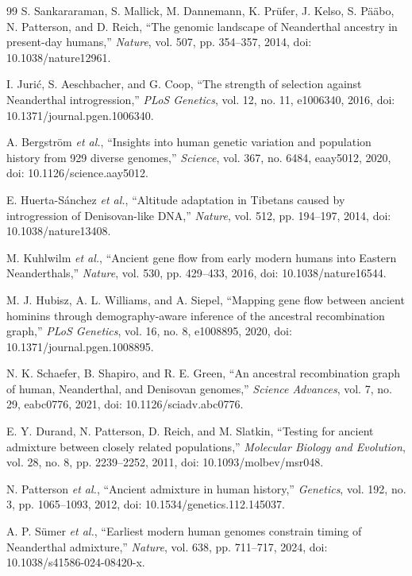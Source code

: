 \documentclass[conference]{IEEEtran}
\begin{document}
\begin{thebibliography}{99}
S. Sankararaman, S. Mallick, M. Dannemann, K. Pr\"ufer, J. Kelso, S. P\"a\"abo, N. Patterson, and D. Reich, ``The genomic landscape of Neanderthal ancestry in present-day humans,'' \emph{Nature}, vol. 507, pp. 354--357, 2014, doi: 10.1038/nature12961.

I. Juri\'c, S. Aeschbacher, and G. Coop, ``The strength of selection against Neanderthal introgression,'' \emph{PLoS Genetics}, vol. 12, no. 11, e1006340, 2016, doi: 10.1371/journal.pgen.1006340.

A. Bergstr\"om \emph{et al.}, ``Insights into human genetic variation and population history from 929 diverse genomes,'' \emph{Science}, vol. 367, no. 6484, eaay5012, 2020, doi: 10.1126/science.aay5012.

E. Huerta-S\'anchez \emph{et al.}, ``Altitude adaptation in Tibetans caused by introgression of Denisovan-like DNA,'' \emph{Nature}, vol. 512, pp. 194--197, 2014, doi: 10.1038/nature13408.

M. Kuhlwilm \emph{et al.}, ``Ancient gene flow from early modern humans into Eastern Neanderthals,'' \emph{Nature}, vol. 530, pp. 429--433, 2016, doi: 10.1038/nature16544.

M. J. Hubisz, A. L. Williams, and A. Siepel, ``Mapping gene flow between ancient hominins through demography-aware inference of the ancestral recombination graph,'' \emph{PLoS Genetics}, vol. 16, no. 8, e1008895, 2020, doi: 10.1371/journal.pgen.1008895.

N. K. Schaefer, B. Shapiro, and R. E. Green, ``An ancestral recombination graph of human, Neanderthal, and Denisovan genomes,'' \emph{Science Advances}, vol. 7, no. 29, eabc0776, 2021, doi: 10.1126/sciadv.abc0776.

E. Y. Durand, N. Patterson, D. Reich, and M. Slatkin, ``Testing for ancient admixture between closely related populations,'' \emph{Molecular Biology and Evolution}, vol. 28, no. 8, pp. 2239--2252, 2011, doi: 10.1093/molbev/msr048.

N. Patterson \emph{et al.}, ``Ancient admixture in human history,'' \emph{Genetics}, vol. 192, no. 3, pp. 1065--1093, 2012, doi: 10.1534/genetics.112.145037.

A. P. S\"umer \emph{et al.}, ``Earliest modern human genomes constrain timing of Neanderthal admixture,'' \emph{Nature}, vol. 638, pp. 711--717, 2024, doi: 10.1038/s41586-024-08420-x.

\end{thebibliography}
\end{document}
